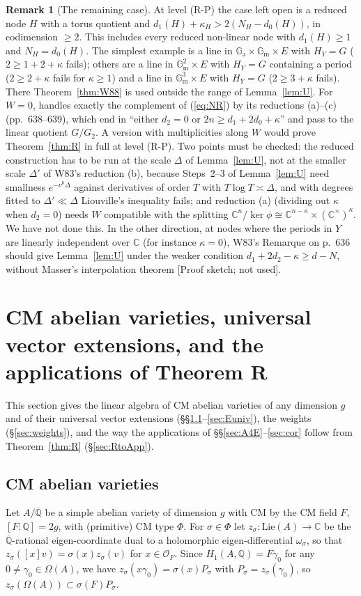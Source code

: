 \documentclass[11pt]{amsart}
\theoremstyle{definition}
\newtheorem{remark}[theorem]{Remark}
\newcommand{\Qb}{\overline{\mathbb{Q}}}
\newcommand{\C}{\mathbb{C}}
\newcommand{\Q}{\mathbb{Q}}
\newcommand{\Ga}{\mathbb{G}_{\mathrm a}}
\newcommand{\Gm}{\mathbb{G}_{\mathrm m}}
\newcommand{\lab}[1]{\textup{[#1]}}
\begin{document}
\begin{remark}[The remaining case]\label{rem:G3}
At level (R-P) the case left open is a reduced node $H$ with a torus quotient and
$d_1(H)+\kappa_H>2(N_H-d_0(H))$, in codimension $\ge2$. This includes every reduced non-linear node with $d_1(H)\ge1$ and
$N_H=d_0(H)$. The simplest example is a line in $\Ga\times\Gm\times E$ with $H_Y=G$ ($2\ge1+2+\kappa$ fails); others are
a line in $\Gm^2\times E$ with $H_Y=G$ containing a period ($2\ge2+\kappa$ fails for $\kappa\ge1$) and a line in
$\Gm^3\times E$ with $H_Y=G$ ($2\ge3+\kappa$ fails). There Theorem~\ref{thm:W88} is used outside the range of Lemma~\ref{lem:U}. For $W=0$, \cite[Prop.~2.4]{W83}
handles exactly the complement of (\ref{eq:NR}) by its reductions (a)--(c) (pp.~638--639), which end in ``either $d_2=0$
or $2n\ge d_1+2d_0+\kappa$'' and pass to the linear quotient $G/G_2$. A version with multiplicities along $W$ would prove
Theorem~\ref{thm:R} in full at level (R-P). Two points must be checked: the reduced construction has to be run at the
scale $\Delta$ of Lemma~\ref{lem:U}, not at the smaller scale $\Delta'$ of W83's reduction (b), because Steps~2--3 of
Lemma~\ref{lem:U} need smallness $e^{-\nu^6\Delta}$ against derivatives of order $T$ with $T\log T\asymp\Delta$, and with
degrees fitted to $\Delta'\ll\Delta$ Liouville's inequality fails; and reduction (a) (dividing out $\kappa$ when $d_2=0$) needs
$W$ compatible with the splitting $\C^n/\ker\phi\cong\C^{n-\kappa}\times(\C^\times)^\kappa$. We have not done this. In the
other direction, at nodes where the periods in $Y$ are linearly independent over $\C$ (for instance $\kappa=0$), W83's
Remarque on p.~636 should give Lemma~\ref{lem:U} under the weaker condition $d_1+2d_2-\kappa\ge d-N$, without Masser's
interpolation theorem \lab{Proof sketch; not used}.
\end{remark}

\section{CM abelian varieties, universal vector extensions, and the applications of Theorem R}\label{sec:CMsetting}
This section gives the linear algebra of CM abelian varieties of any dimension $g$ and of their universal vector
extensions (\S\S\ref{sec:setting}--\ref{sec:Euniv}), the weights (\S\ref{sec:weights}), and the way the applications of
\S\S\ref{sec:A4E}--\ref{sec:cor} follow from Theorem~\ref{thm:R} (\S\ref{sec:RtoApp}).

\subsection{CM abelian varieties}\label{sec:setting}
Let $A/\Qb$ be a simple abelian variety of dimension $g$ with CM by the CM field $F$, $[F:\Q]=2g$, with (primitive) CM
type $\Phi$. For $\sigma\in\Phi$ let $z_\sigma\colon\mathrm{Lie}(A)\to\C$ be the $\Qb$-rational eigen-coordinate dual to a
holomorphic eigen-differential $\omega_\sigma$, so that $z_\sigma([x]v)=\sigma(x)z_\sigma(v)$ for $x\in\mathcal O_F$. Since
$H_1(A,\Q)=F\gamma_0$ for any $0\ne\gamma_0\in\Omega(A)$, we have $z_\sigma(x\gamma_0)=\sigma(x)P_\sigma$ with
$P_\sigma=z_\sigma(\gamma_0)$, so $z_\sigma(\Omega(A))\subset\sigma(F)P_\sigma$.
\end{document}
